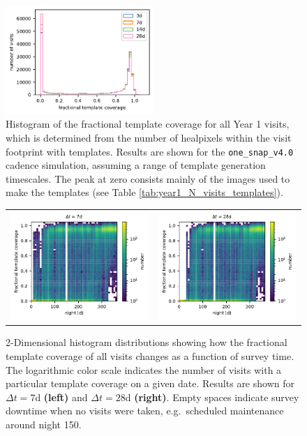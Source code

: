 \documentclass[preprintm,linenumbers]{aastex631}
\newcommand{\baseline}{\texttt{one\_snap\_v4.0}\xspace}
\begin{document}
  		
		\begin{figure}
			\centering
			\includegraphics[width=0.5\textwidth]{results/fractional_template_coverage_first_year_one_snap_v4_0_10yrs_db_noDD_noTwi.pdf}
			\caption{Histogram of the fractional template coverage for all Year 1 visits, which is determined from the number of healpixels within the visit footprint with templates.
				Results are shown for the \baseline cadence simulation, assuming a range of template generation timescales.
				The peak at zero consists mainly of the images used to make the templates (see Table \ref{tab:year1_N_visits_templates}).
			}
			\label{fig:fractional_template_coverage}
		\end{figure}

  \begin{figure}
      \centering
      			\begin{tabular}{c c}
      \includegraphics[width=0.4\linewidth]{results/fractional_template_coverage_first_year_one_snap_v4_0_10yrs_db_noDD_noTwi_7_2d_hist.pdf} &
            \includegraphics[width=0.4\linewidth]{results/fractional_template_coverage_first_year_one_snap_v4_0_10yrs_db_noDD_noTwi_28_2d_hist.pdf} \\
\end{tabular}
\caption{2-Dimensional histogram distributions showing how the fractional template coverage of all visits changes as a function of survey time.
The logarithmic color scale indicates the number of visits with a particular template coverage on a given date. Results are shown for $\Delta t = 7$d \textbf{(left)} and $\Delta t = 28$d \textbf{(right)}.
Empty spaces indicate survey downtime when no visits were taken, e.g.\ scheduled maintenance around night 150.
}
\label{fig:fractional_template_coverage-2d}
  \end{figure}
  
\end{document}
